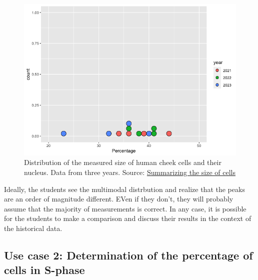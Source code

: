 \documentclass[
]{agujournal2019}
\begin{document}
\begin{figure}[H]

{\centering \includegraphics{index_files/figure-latex/fig-histogram-output-1.png}

}

\caption{\label{fig-histogram}Distribution of the measured size of human
cheek cells and their nucleus. Data from three years. Source:
\href{https://JoachimGoedhart.github.io/MS-StudentSourcing/notebooks/CellSizeR-preview.html\#cell-fig-histogram}{Summarizing
the size of cells}}

\end{figure}

Ideally, the students see the multimodal distrbution and realize that
the peaks are an order of magnitude different. EVen if they don't, they
will probably assume that the majority of measurements is correct. In
any case, it is possible for the students to make a comparison and
discuss their results in the context of the historical data.

\hypertarget{use-case-2-determination-of-the-percentage-of-cells-in-s-phase}{%
\subsection*{Use case 2: Determination of the percentage of cells in
S-phase}\label{use-case-2-determination-of-the-percentage-of-cells-in-s-phase}}
\end{document}
